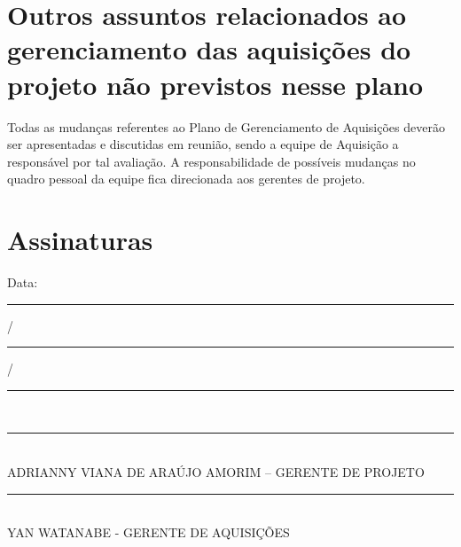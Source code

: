 \documentclass[12pt,openright,oneside,a4paper,brazil]{abntex2}
\begin{document}
\section{Outros assuntos relacionados ao gerenciamento das aquisições do projeto não previstos nesse plano}
Todas as mudanças referentes ao Plano de Gerenciamento de Aquisições deverão ser apresentadas e discutidas em reunião, sendo a equipe de Aquisição a responsável por tal avaliação. A responsabilidade de possíveis mudanças no quadro pessoal da equipe fica direcionada aos gerentes de projeto.

\section{Assinaturas}
\begin{center}
Data: \rule{0.5cm}{0.1mm}/\rule{0.5cm}{0.1mm}/\rule{1cm}{0.1mm}     \\
\rule{13cm}{0.1mm}\\
ADRIANNY VIANA DE ARAÚJO AMORIM – GERENTE DE PROJETO\\
\rule{13cm}{0.1mm}\\
YAN WATANABE - GERENTE DE AQUISIÇÕES

\end{center}
\end{document}
